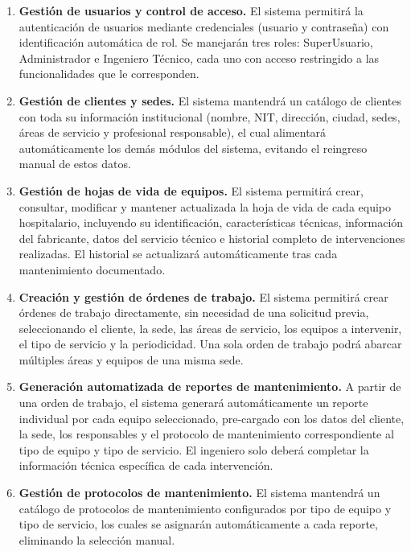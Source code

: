 \documentclass[12pt,a4paper]{article}
\begin{document}
\begin{enumerate}
  \item[\textbf{a)}] \textbf{Gestión de usuarios y control de acceso.}
  El sistema permitirá la autenticación de usuarios mediante credenciales (usuario y contraseña) con identificación automática de rol. Se manejarán tres roles: SuperUsuario, Administrador e Ingeniero Técnico, cada uno con acceso restringido a las funcionalidades que le corresponden.

  \item[\textbf{b)}] \textbf{Gestión de clientes y sedes.}
  El sistema mantendrá un catálogo de clientes con toda su información institucional (nombre, NIT, dirección, ciudad, sedes, áreas de servicio y profesional responsable), el cual alimentará automáticamente los demás módulos del sistema, evitando el reingreso manual de estos datos.

  \item[\textbf{c)}] \textbf{Gestión de hojas de vida de equipos.}
  El sistema permitirá crear, consultar, modificar y mantener actualizada la hoja de vida de cada equipo hospitalario, incluyendo su identificación, características técnicas, información del fabricante, datos del servicio técnico e historial completo de intervenciones realizadas. El historial se actualizará automáticamente tras cada mantenimiento documentado.

  \item[\textbf{d)}] \textbf{Creación y gestión de órdenes de trabajo.}
  El sistema permitirá crear órdenes de trabajo directamente, sin necesidad de una solicitud previa, seleccionando el cliente, la sede, las áreas de servicio, los equipos a intervenir, el tipo de servicio y la periodicidad. Una sola orden de trabajo podrá abarcar múltiples áreas y equipos de una misma sede.

  \item[\textbf{e)}] \textbf{Generación automatizada de reportes de mantenimiento.}
  A partir de una orden de trabajo, el sistema generará automáticamente un reporte individual por cada equipo seleccionado, pre-cargado con los datos del cliente, la sede, los responsables y el protocolo de mantenimiento correspondiente al tipo de equipo y tipo de servicio. El ingeniero solo deberá completar la información técnica específica de cada intervención.

  \item[\textbf{f)}] \textbf{Gestión de protocolos de mantenimiento.}
  El sistema mantendrá un catálogo de protocolos de mantenimiento configurados por tipo de equipo y tipo de servicio, los cuales se asignarán automáticamente a cada reporte, eliminando la selección manual.


\end{enumerate}
\end{document}
